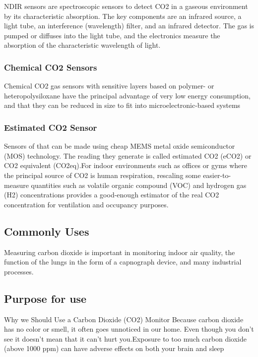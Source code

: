 \documentclass[12pt]{article}
\begin{document}
NDIR sensors are spectroscopic sensors to detect CO2 in a gaseous environment by its characteristic absorption. The key components are an infrared source, a light tube, an interference (wavelength) filter, and an infrared detector. The gas is pumped or diffuses into the light tube, and the electronics measure the absorption of the characteristic wavelength of light.\newline
 
\subsubsection{Chemical CO2 Sensors}


Chemical CO2 gas sensors with sensitive layers based on polymer- or heteropolysiloxane have the principal advantage of very low energy consumption, and that they can be reduced in size to fit into microelectronic-based systems



\subsubsection{Estimated CO2 Sensor}


Sensors of that  can be made using cheap  MEMS metal oxide semiconductor (MOS) technology. The reading they generate is called estimated CO2 (eCO2) or CO2 equivalent (CO2eq).For indoor environments such as offices or gyms where the principal source of CO2 is human respiration, rescaling some easier-to-measure quantities such as volatile organic compound (VOC) and hydrogen gas (H2) concentrations provides a good-enough estimator of the real CO2 concentration for ventilation and occupancy purposes.




\subsection{Commonly Uses}

Measuring carbon dioxide is important in monitoring indoor air quality, the function of the lungs in the form of a capnograph device, and many industrial processes.



\subsection{Purpose for use}Why we Should Use a Carbon Dioxide (CO2) Monitor\newline
Because carbon dioxide has no color or smell, it often goes unnoticed in our home. Even though you don’t see it doesn’t mean that it can’t hurt you.Exposure to too much carbon dioxide (above 1000 ppm) can have adverse effects on both your brain and sleep
\end{document}
